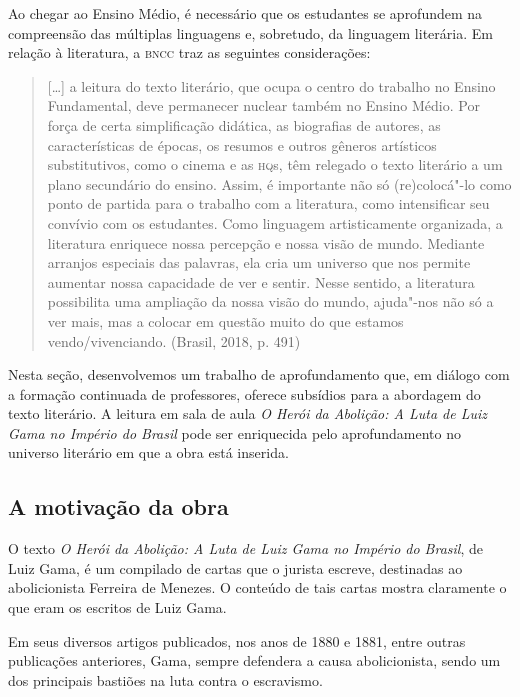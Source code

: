 \documentclass[12pt]{extarticle}
\begin{document}
Ao chegar ao Ensino Médio, é necessário que os estudantes se aprofundem
na compreensão das múltiplas linguagens e, sobretudo, da linguagem
literária. Em relação à literatura, a \textsc{bncc} traz as seguintes
considerações:

\begin{quote}
{[}\ldots{}{]} a leitura do texto literário, que ocupa o centro do trabalho
no Ensino Fundamental, deve permanecer nuclear também no Ensino Médio.
Por força de certa simplificação didática, as biografias de autores, as
características de épocas, os resumos e outros gêneros artísticos
substitutivos, como o cinema e as \textsc{hq}s, têm relegado o texto literário a
um plano secundário do ensino. Assim, é importante não só (re)colocá"-lo
como ponto de partida para o trabalho com a literatura, como
intensificar seu convívio com os estudantes. Como linguagem
artisticamente organizada, a literatura enriquece nossa percepção e
nossa visão de mundo. Mediante arranjos especiais das palavras, ela cria
um universo que nos permite aumentar nossa capacidade de ver e sentir.
Nesse sentido, a literatura possibilita uma ampliação da nossa visão do
mundo, ajuda"-nos não só a ver mais, mas a colocar em questão muito do
que estamos vendo/vivenciando. (Brasil, 2018, p. 491)
\end{quote}

Nesta seção, desenvolvemos um trabalho de aprofundamento que, em diálogo
com a formação continuada de professores, oferece subsídios para a
abordagem do texto literário. A leitura em sala de aula \emph{O Herói da
Abolição: A Luta de Luiz Gama no Império do Brasil} pode ser enriquecida
pelo aprofundamento no universo literário em que a obra está inserida.




\subsection{A motivação da obra}

O texto \emph{O Herói da Abolição: A Luta de Luiz Gama no Império do
Brasil}, de Luiz Gama, é um compilado de cartas que o jurista escreve,
destinadas ao abolicionista Ferreira de Menezes. O conteúdo de tais
cartas mostra claramente o que eram os escritos de Luiz Gama.

Em seus diversos artigos publicados, nos anos de 1880 e 1881, entre
outras publicações anteriores, Gama, sempre defendera a causa
abolicionista, sendo um dos principais bastiões na luta contra o
escravismo.
\end{document}

